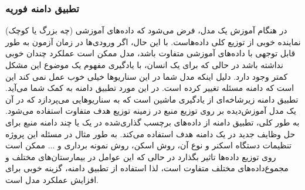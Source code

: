 \subsubsection{تطبیق دامنه فوریه}
در هنگام آموزش یک مدل، فرض می‌شود که داده‌های آموزشی (چه بزرگ یا کوچک) نماینده خوبی از توزیع کلی داده‌هاست.
با این حال، اگر ورودی‌ها در زمان آزمون به طور قابل توجهی با داده‌های آموزشی متفاوت باشد، مدل ممکن است عملکرد چندان خوبی نداشته باشد در حالی که برای یک انسان، با یادگیری مفهوم یک موضوع این مشکل کمتر وجود دارد.
دلیل اینکه مدل شما در این سناریوها خیلی خوب عمل نمی کند این است که دامنه مسئله تغییر کرده است. در این مورد تطبیق دامنه به کمک شما می‌آید. تطبیق دامنه زیرشاخه‌ای از یادگیری ماشین است که به سناریوهایی می‌پردازد که در آن یک مدل آموزش‌دیده بر روی توزیع منبع در زمینه توزیع هدف متفاوت استفاده می‌شود. به طور کلی، تطبیق دامنه از داده‌های برچسب گذاری‌شده در یک یا چند دامنه منبع برای حل وظایف جدید در یک دامنه هدف استفاده می‌کند.
\newline
به طور مثال در مسئله این پروژه تنظیمات دستگاه اسکنر و نوع آن، روش اسکن، روش نمونه برداری و ... ممکن است روی توزیع داده‌ها تاثیر بگذارد در حالی که این عوامل در بیمارستان‌های مختلف و مجموع‌داده‌های مختلف متفاوت است، لذا استفاده از تطبیق دامنه، گزینه خوبی برای افزایش عملکرد مدل است.

